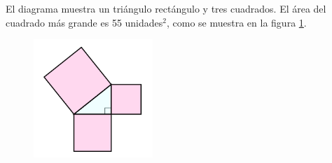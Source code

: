 El diagrama muestra un triángulo rectángulo y tres cuadrados.
El área del cuadrado más grande es 55 unidades$^2$, como se muestra en la figura \ref{fig:area11}.
\begin{figure}[H]
    \begin{center}
        \includegraphics[width=0.4\textwidth]{../images/area11.png}
    \end{center}
    \caption{}
    \label{fig:area11}
\end{figure}

